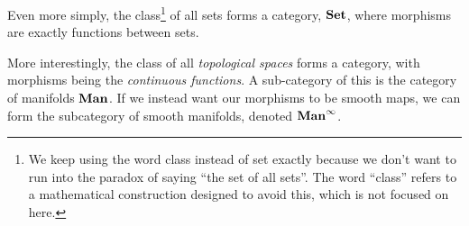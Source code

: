 \begin{appendices}
	Even more simply, the class\footnote{We keep using the word class instead of set exactly because we don't want to run into the paradox of saying ``the set of all sets''. The word ``class'' refers to a mathematical construction designed to avoid this, which is not focused on here.} of all sets forms a category, $\text{\textbf{Set}}$, where morphisms are exactly functions between sets.
	
	More interestingly, the class of all \emph{topological spaces} forms a category, with morphisms being the \emph{continuous functions}. A sub-category of this is the category of manifolds $\text{\textbf{Man}}$. If we instead want our morphisms to be smooth maps, we can form the subcategory of smooth manifolds, denoted $\text{\textbf{Man}}^\infty$.
	
	
\end{appendices}
